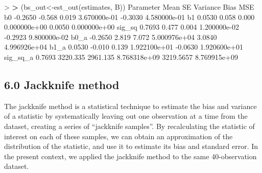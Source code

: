 \documentclass[
]{article}
\newenvironment{Shaded}{\begin{snugshade}}{\end{snugshade}}
\newcommand{\ErrorTok}[1]{\textcolor[rgb]{0.64,0.00,0.00}{\textbf{#1}}}
\newcommand{\FloatTok}[1]{\textcolor[rgb]{0.00,0.00,0.81}{#1}}
\newcommand{\FunctionTok}[1]{\textcolor[rgb]{0.00,0.00,0.00}{#1}}
\newcommand{\NormalTok}[1]{#1}
\newcommand{\OtherTok}[1]{\textcolor[rgb]{0.56,0.35,0.01}{#1}}
\newcommand{\SpecialCharTok}[1]{\textcolor[rgb]{0.00,0.00,0.00}{#1}}
\begin{document}
\begin{Shaded}
\begin{Highlighting}[]
\SpecialCharTok{\textgreater{}} 
\ErrorTok{\textgreater{}}\NormalTok{ (bs\_out}\OtherTok{\textless{}{-}}\FunctionTok{est\_out}\NormalTok{(estimates, B))}
\NormalTok{         Parameter     Mean       SE     Variance      Bias          MSE}
\NormalTok{b0         }\SpecialCharTok{{-}}\FloatTok{0.2650}   \SpecialCharTok{{-}}\FloatTok{0.568}    \FloatTok{0.019} \FloatTok{3.670000e{-}01}   \SpecialCharTok{{-}}\FloatTok{0.3030} \FloatTok{4.580000e{-}01}
\NormalTok{b1          }\FloatTok{0.0530}    \FloatTok{0.058}    \FloatTok{0.000} \FloatTok{0.000000e+00}    \FloatTok{0.0050} \FloatTok{0.000000e+00}
\NormalTok{sig\_sq      }\FloatTok{0.7693}    \FloatTok{0.477}    \FloatTok{0.004} \FloatTok{1.200000e{-}02}   \SpecialCharTok{{-}}\FloatTok{0.2923} \FloatTok{9.800000e{-}02}
\NormalTok{b0\_a       }\SpecialCharTok{{-}}\FloatTok{0.2650}    \FloatTok{2.819}    \FloatTok{7.072} \FloatTok{5.000976e+04}    \FloatTok{3.0840} \FloatTok{4.996926e+04}
\NormalTok{b1\_a        }\FloatTok{0.0530}   \SpecialCharTok{{-}}\FloatTok{0.010}    \FloatTok{0.139} \FloatTok{1.922100e+01}   \SpecialCharTok{{-}}\FloatTok{0.0630} \FloatTok{1.920600e+01}
\NormalTok{sig\_sq\_a    }\FloatTok{0.7693} \FloatTok{3220.335} \FloatTok{2961.135} \FloatTok{8.768318e+09} \FloatTok{3219.5657} \FloatTok{8.769915e+09}
\end{Highlighting}
\end{Shaded}

\hypertarget{jackknife-method}{%
\subsection{6.0 Jackknife method}\label{jackknife-method}}

The jackknife method is a statistical technique to estimate the bias and
variance of a statistic by systematically leaving out one observation at
a time from the dataset, creating a series of ``jackknife samples''. By
recalculating the statistic of interest on each of these samples, we can
obtain an approximation of the distribution of the statistic, and use it
to estimate its bias and standard error. In the present context, we
applied the jackknife method to the same 40-observation dataset.
\end{document}
